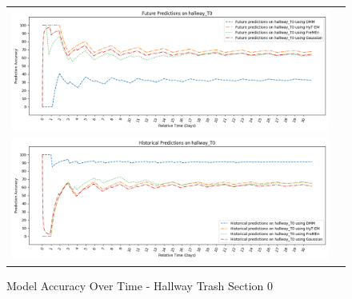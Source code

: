 \begin{figure}[!Hp]
  \begin{tabular}{cc}
    {\includegraphics[width = 6in]{images/results/Future_Predictions_on_hallway_T0.png}} \\
    {\includegraphics[width = 6in]{images/results/Historical_Predictions_on_hallway_T0.png}} \\
  \end{tabular}
  \caption{Model Accuracy Over Time - Hallway Trash Section 0}
\end{figure}



